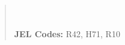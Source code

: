 \documentclass[12pt]{article}
\begin{document}
\begin{titlepage}
\begin{abstract}
\\
\vspace{0in}\\
\noindent\textbf{JEL Codes:} R42, H71, R10 \\

\bigskip
\end{abstract} 
\setcounter{page}{0}
\thispagestyle{empty}
\end{titlepage}
\pagebreak \newpage
\end{document}
